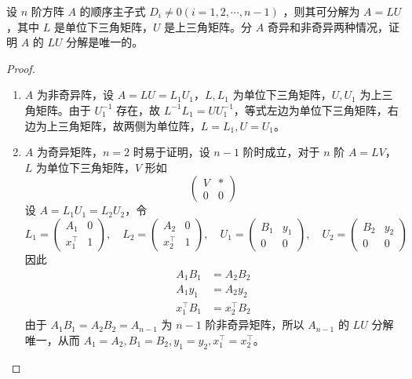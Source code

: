 \begin{exercise}
    设 $n$ 阶方阵 $A$ 的顺序主子式 $D_i \neq 0(i=1,2, \cdots, n-1)$ ，则其可分解为 $A=L U$ ，其中 $L$ 是单位下三角矩阵，$U$ 是上三角矩阵。分 $A$ 奇异和非奇异两种情况，证明 $A$ 的 $L U$ 分解是唯一的。
\end{exercise}
\begin{proof}
    \begin{enumerate}
        \item $A$ 为非奇异阵，设 $A=LU=L_1U_1$，$L, L_1$ 为单位下三角矩阵，$U, U_1$ 为上三角矩阵。由于 $U_1^{-1}$ 存在，故 $L^{-1}L_1=UU_1^{-1}$，等式左边为单位下三角矩阵，右边为上三角矩阵，故两侧为单位阵，$L=L_1, U=U_1$。
        \item $A$ 为奇异矩阵，$n=2$ 时易于证明，设 $n-1$ 阶时成立，对于 $n$ 阶 $A=LV$，$L$ 为单位下三角矩阵，$V$ 形如
              \[
                  \begin{pmatrix}
                      V & * \\
                      0 & 0
                  \end{pmatrix}
              \]
              设 $A=L_1U_1=L_2U_2$，令
              \[
                  L_1=\begin{pmatrix}
                      A_1        & 0 \\
                      x_1^{\top} & 1
                  \end{pmatrix}, \quad
                  L_2=\begin{pmatrix}
                      A_2        & 0 \\
                      x_2^{\top} & 1
                  \end{pmatrix}, \quad
                  U_1=\begin{pmatrix}
                      B_1 & y_1 \\
                      0   & 0
                  \end{pmatrix}, \quad
                  U_2=\begin{pmatrix}
                      B_2 & y_2 \\
                      0   & 0
                  \end{pmatrix}
              \]
              因此
              \[
                  \begin{aligned}
                      A_1B_1        & = A_2B_2        \\
                      A_1y_1        & = A_2y_2        \\
                      x_1^{\top}B_1 & = x_2^{\top}B_2
                  \end{aligned}
              \]
              由于 $A_1B_1=A_2B_2=A_{n-1}$ 为 $n-1$ 阶非奇异矩阵，所以 $A_{n-1}$ 的 $LU$ 分解唯一，从而 $A_1=A_2, B_1=B_2, y_1=y_2, x_1^{\top}=x_2^{\top}$。
    \end{enumerate}
\end{proof}



